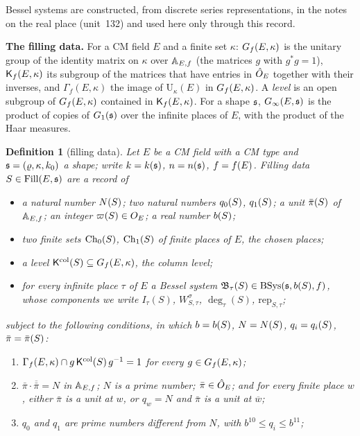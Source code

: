 \documentclass[11pt,a4paper]{article}
\newcommand{\subhead}[1]{\par\addvspace{9pt plus 2pt}\Needspace{4\baselineskip}\noindent\textbf{#1}\enspace\ignorespaces}
\theoremstyle{plainx}
\theoremstyle{uprightx}
\newtheorem{definition}[theorem]{Definition}
\newcommand{\cj}[1]{\overline{#1}}                  %
\newcommand{\adj}[1]{#1^{*}}                        %
\newcommand{\Wsys}[3]{W^{#1}_{#2,#3}}               %
\newcommand{\Isys}[2]{I_{#2}(#1)}                  %
\newcommand{\degsys}[2]{\deg_{#2}(#1)}             %
\newcommand{\repsys}[2]{\mathrm{rep}_{#1,#2}}      %
\newcommand{\Ginf}[2]{G_{\infty}(#1,#2)}           %
\newcommand{\Uni}{\mathrm{U}}
\newcommand{\IntE}{O_E}
\begin{document}
Bessel systems are constructed, from discrete series representations, in the notes on the real place (unit~132)
and used here only through this record.

\subhead{The filling data.}
For a CM field $E$ and a finite set $\kappa$: $\Gf{E}{\kappa}$ is the unitary group of the identity matrix on $\kappa$
over $\AEf$ (the matrices $g$ with $\adj{g}g=1$), $\Kf{E}{\kappa}$ its subgroup of the matrices that have entries in
$\hO$ together with their inverses, and $\Gamma_f(E,\kappa)$ the image of $\Uni_\kappa(E)$ in $\Gf{E}{\kappa}$. A
\emph{level} is an open subgroup of $\Gf{E}{\kappa}$ contained in $\Kf{E}{\kappa}$. For a shape $\fs$, $\Ginf{E}{\fs}$ is the
product of copies of $\Gone{\fs}$ over the infinite places of $E$, with the product of the Haar measures.

\begin{definition}[filling data]\label{d:filling}
Let $E$ be a CM field with a CM type and $\fs=(\varrho,\kappa,k_0)$ a shape; write $k=\kk{\fs}$, $n=\nn{\fs}$,
$f=\ninf{E}$. \emph{Filling data} $S\in\Fill{E}{\fs}$ are a record of
\begin{itemize}
\item a natural number $\NS{S}$; two natural numbers $\qS{S}{0}$, $\qS{S}{1}$; a unit $\piS{S}$ of $\AEf$; an integer
$\vpS{S}\in\IntE$; a real number $\bS{S}$;
\item two finite sets $\ChS{S}{0}$, $\ChS{S}{1}$ of finite places of $E$, the \emph{chosen places};
\item a level $\KcolS{S}\subseteq\Gf{E}{\kappa}$, the \emph{column level};
\item for every infinite place $\tau$ of $E$ a Bessel system $\BsysS{S}{\tau}\in\BSys{\fs}{\bS{S}}{f}$, whose components
we write $\Isys{S}{\tau}$, $\Wsys{\sigma}{S}{\tau}$, $\degsys{S}{\tau}$, $\repsys{S}{\tau}$;
\end{itemize}
subject to the following conditions, in which $b=\bS{S}$, $N=\NS{S}$, $q_i=\qS{S}{i}$, $\bar\pi=\piS{S}$:
\begin{enumerate}[label=(F\arabic*),leftmargin=3em]
\item $\Gamma_f(E,\kappa)\cap g\,\KcolS{S}\,g^{-1}=1$ for every $g\in\Gf{E}{\kappa}$;
\item $\bar\pi\cdot\cj{\bar\pi}=N$ in $\AEf$; $N$ is a prime number; $\bar\pi\in\hO$; and for every finite place
$w$, either $\bar\pi$ is a unit at $w$, or $q_w=N$ and $\bar\pi$ is a unit at $\cj{w}$;
\item $q_0$ and $q_1$ are prime numbers different from $N$, with $b^{10}\le q_i\le b^{11}$;

\end{enumerate}
\end{definition}
\end{document}
